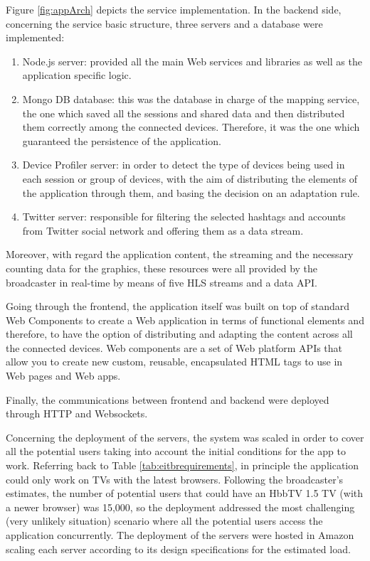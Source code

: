 Figure \ref{fig:appArch} depicts the service implementation. In the backend side, concerning the service basic structure, three servers and a database were implemented:
\begin{enumerate}
	\item Node.js server: provided all the main Web services and libraries as well as the application specific logic.
	\item Mongo DB database: this was the database in charge of the mapping service, the one which saved all the sessions and shared data and then distributed them correctly among the connected devices. Therefore, it was the one which guaranteed the persistence of the application.
	\item Device Profiler server: in order to detect the type of devices being used in each session or group of devices, with the aim of distributing the elements of the application through them, and basing the decision on an adaptation rule.
	\item Twitter server: responsible for filtering the selected hashtags and accounts from Twitter social network and offering them as a data stream.
\end{enumerate}

Moreover, with regard the application content, the streaming and the necessary counting data for the graphics, these resources were all provided by the broadcaster in real-time by means of five HLS streams and a data API. 

Going through the frontend, the application itself was built on top of standard Web Components \cite{webcomps} to create a Web application in terms of functional elements and therefore, to have the option of distributing and adapting the content across all the connected devices. Web components are a set of Web platform APIs that allow you to create new custom, reusable, encapsulated HTML tags to use in Web pages and Web apps.  

Finally, the communications between frontend and backend were deployed through HTTP and Websockets. 

Concerning the deployment of the servers, the system was scaled in order to cover all the potential users taking into account the initial conditions for the app to work. Referring back to Table \ref{tab:eitbrequirements}, in principle the application could only work on TVs with the latest browsers. Following the broadcaster’s estimates, the number of potential users that could have an HbbTV 1.5 TV (with a newer browser) was 15,000, so the deployment addressed the most challenging (very unlikely situation) scenario where all the potential users access the application concurrently. The deployment of the servers were hosted in Amazon \cite{aws} scaling each server according to its design specifications for the estimated load.

